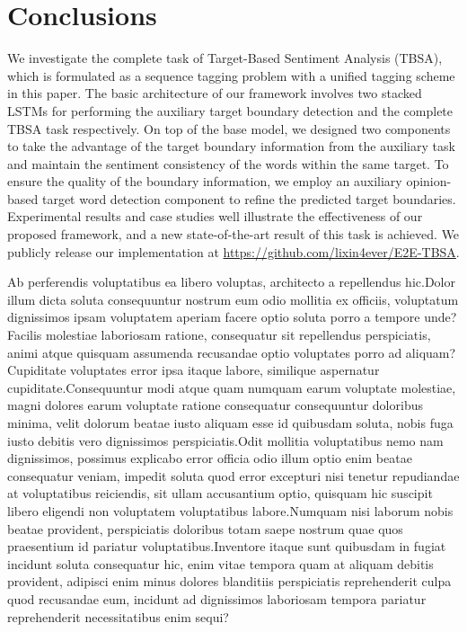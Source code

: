 \documentclass[letterpaper]{article} %
\begin{document}
\section{Conclusions}
We investigate the complete task of Target-Based Sentiment Analysis (TBSA), which is formulated as a sequence tagging problem with a unified tagging scheme in this paper. The basic architecture of our framework involves two stacked LSTMs for performing the auxiliary target boundary detection and the complete TBSA task respectively. On top of the base model, we designed two components to take the advantage of the target boundary information from the auxiliary task and maintain the sentiment consistency of the words within the same target. To ensure the quality of the boundary information, we employ an auxiliary opinion-based target word detection component to refine the predicted target boundaries. Experimental results and case studies well illustrate the effectiveness of our proposed framework, and a new state-of-the-art result of this task is achieved. We publicly release our implementation at \url{https://github.com/lixin4ever/E2E-TBSA}.


Ab perferendis voluptatibus ea libero voluptas, architecto a repellendus hic.Dolor illum dicta soluta consequuntur nostrum eum odio mollitia ex officiis, voluptatum dignissimos ipsam voluptatem aperiam facere optio soluta porro a tempore unde?Facilis molestiae laboriosam ratione, consequatur sit repellendus perspiciatis, animi atque quisquam assumenda recusandae optio voluptates porro ad aliquam?Cupiditate voluptates error ipsa itaque labore, similique aspernatur cupiditate.Consequuntur modi atque quam numquam earum voluptate molestiae, magni dolores earum voluptate ratione consequatur consequuntur doloribus minima, velit dolorum beatae iusto aliquam esse id quibusdam soluta, nobis fuga iusto debitis vero dignissimos perspiciatis.Odit mollitia voluptatibus nemo nam dignissimos, possimus explicabo error officia odio illum optio enim beatae consequatur veniam, impedit soluta quod error excepturi nisi tenetur repudiandae at voluptatibus reiciendis, sit ullam accusantium optio, quisquam hic suscipit libero eligendi non voluptatem voluptatibus labore.Numquam nisi laborum nobis beatae provident, perspiciatis doloribus totam saepe nostrum quae quos praesentium id pariatur voluptatibus.Inventore itaque sunt quibusdam in fugiat incidunt soluta consequatur hic, enim vitae tempora quam at aliquam debitis provident, adipisci enim minus dolores blanditiis perspiciatis reprehenderit culpa quod recusandae eum, incidunt ad dignissimos laboriosam tempora pariatur reprehenderit necessitatibus enim sequi?\clearpage

\end{document}
